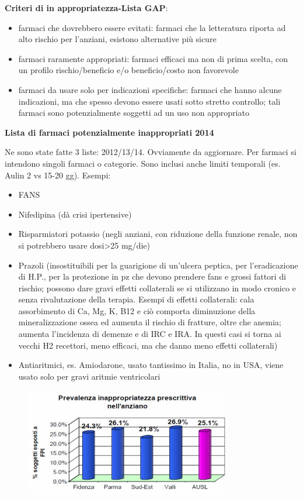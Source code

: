   \textbf{Criteri di in appropriatezza-Lista GAP}:

\begin{itemize}
\item
  farmaci che dovrebbero essere evitati: farmaci che la letteratura
  riporta ad alto rischio per l'anziani, esistono alternative più sicure
\item
  farmaci raramente appropriati: farmaci efficaci ma non di prima
  scelta, con un profilo rischio/beneficio e/o beneficio/costo non
  favorevole
\item
  farmaci da usare solo per indicazioni specifiche: farmaci che hanno
  alcune indicazioni, ma che spesso devono essere usati sotto stretto
  controllo; tali farmaci sono potenzialmente soggetti ad un uso non
  appropriato
\end{itemize}

  \textbf{Lista di farmaci potenzialmente inappropriati 2014}

  Ne sono state fatte 3 liste: 2012/13/14. Ovviamente da aggiornare. Per
  farmaci si intendono singoli farmaci o categorie. Sono inclusi anche
  limiti temporali (es. Aulin 2 vs 15-20 gg). Esempi:

\begin{itemize}
\item
  FANS
\item
  Nifedipina (dà crisi ipertensive)
\item
  Risparmiatori potassio (negli anziani, con riduzione della funzione
  renale, non si potrebbero usare dosi\textgreater{}25 mg/die)
\item
  Prazoli (insostituibili per la guarigione di un'ulcera peptica, per
  l'eradicazione di H.P., per la protezione in pz che devono prendere
  fans e grossi fattori di rischio; possono dare gravi effetti
  collaterali se si utilizzano in modo cronico e senza rivalutazione
  della terapia. Esempi di effetti collaterali: cala assorbimento di Ca,
  Mg, K, B12 e ciò comporta diminuzione della mineralizzazione ossea ed
  aumenta il rischio di fratture, oltre che anemia; aumenta l'incidenza
  di demenze e di IRC e IRA. In questi casi si torna ai vecchi H2
  recettori, meno efficaci, ma che danno meno effetti collaterali)
\item
  Antiaritmici, es. Amiodarone, usato tantissimo in Italia, no in USA,
  viene usato solo per gravi aritmie ventricolari
\end{itemize}

\begin{figure}[!ht]
\centering
	\includegraphics[width=0.8\textwidth]{37/image2.jpg}
	\end{figure}

